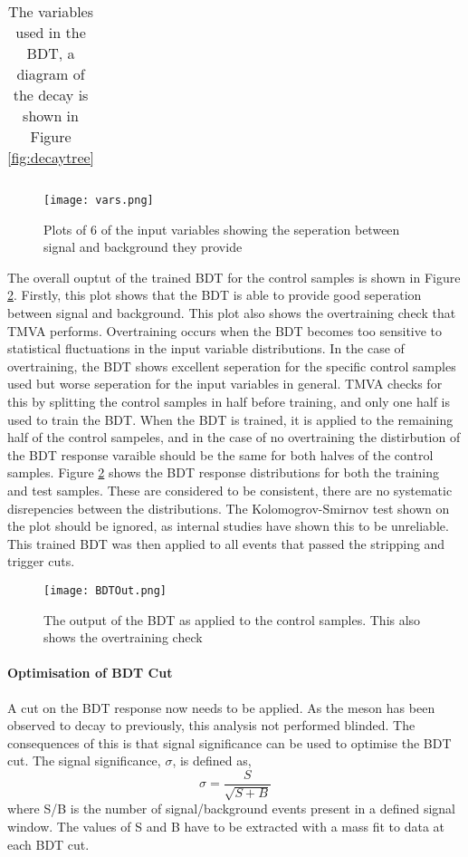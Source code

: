 \begin{table}[h]
\begin{tabular}{|c|p{10cm}|}
  \end{tabular}
  \caption{The variables used in the BDT, a diagram of the decay is shown in Figure \ref{fig:decaytree}}
\end{table}

\begin{figure}
  \centering
  \texttt{[image: vars.png]}
  \caption{Plots of 6 of the input variables showing the seperation between signal and background they provide}
  \label{fig:vars}
\end{figure}

The overall ouptut of the trained BDT for the control samples is shown in Figure \ref{fig:BDTOut}.  Firstly, this plot shows that the BDT is able to provide good seperation between signal and background.  This plot also shows the overtraining check that TMVA performs.  Overtraining occurs when the BDT becomes too sensitive to statistical fluctuations in the input variable distributions.  In the case of overtraining, the BDT shows excellent seperation for the specific control samples used but worse seperation for the input variables in general.  TMVA checks for this by splitting the control samples in half before training, and only one half is used to train the BDT.  When the BDT is trained, it is applied to the remaining half of the control sampeles, and in the case of no overtraining the distirbution of the BDT response varaible should be the same for both halves of the control samples.  Figure \ref{fig:BDTOut} shows the BDT response distributions for both the training and test samples. These are considered to be consistent, there are no systematic disrepencies between the distributions.  The Kolomogrov-Smirnov test shown on the plot should be ignored, as internal \lhcb studies have shown this to be unreliable\cite{Grünberg:2019861}.  This trained BDT was then applied to all events that passed the stripping and trigger cuts.

\begin{figure}
  \centering
  \texttt{[image: BDTOut.png]}
  \caption{The output of the BDT as applied to the control samples.  This also shows the overtraining check}
  \label{fig:BDTOut}
\end{figure}

\paragraph{Optimisation of BDT Cut}
A cut on the BDT response now needs to be applied.  As the \Bd meson has been observed to decay to \Kstar \etaz previously, this analysis not performed blinded.  The consequences of this is that signal significance can be used to optimise the BDT cut.  The signal significance, $\sigma$, is defined as,
\begin{equation}
  \sigma=\frac{S}{\sqrt{S+B}}
\end{equation}
where S/B is the number of signal/background events present in a defined signal window.  The values of S and B have to be extracted with a mass fit to data at each BDT cut.

